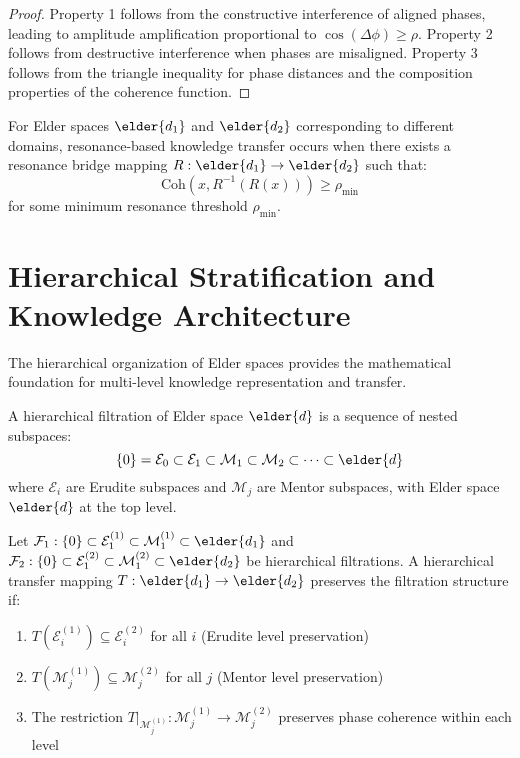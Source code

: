 \begin{proof}
Property 1 follows from the constructive interference of aligned phases, leading to amplitude amplification proportional to $\cos(\Delta\phi) \geq \rho$. Property 2 follows from destructive interference when phases are misaligned. Property 3 follows from the triangle inequality for phase distances and the composition properties of the coherence function.
\end{proof}

\begin{corollary}
For Elder spaces $\elder{d_1}$ and $\elder{d_2}$ corresponding to different domains, resonance-based knowledge transfer occurs when there exists a resonance bridge mapping $R: \elder{d_1} \rightarrow \elder{d_2}$ such that:
\begin{equation}
\text{Coh}(x, R^{-1}(R(x))) \geq \rho_{\text{min}}
\end{equation}
for some minimum resonance threshold $\rho_{\text{min}}$.
\end{corollary}

\section{Hierarchical Stratification and Knowledge Architecture}

The hierarchical organization of Elder spaces provides the mathematical foundation for multi-level knowledge representation and transfer.

\begin{definition}
A hierarchical filtration of Elder space $\elder{d}$ is a sequence of nested subspaces:
\begin{equation}
\{0\} = \mathcal{E}_0 \subset \mathcal{E}_1 \subset \mathcal{M}_1 \subset \mathcal{M}_2 \subset \cdots \subset \elder{d}
\end{equation}
where $\mathcal{E}_i$ are Erudite subspaces and $\mathcal{M}_j$ are Mentor subspaces, with Elder space $\elder{d}$ at the top level.
\end{definition}

\begin{theorem}
Let $\mathcal{F}_1: \{0\} \subset \mathcal{E}_1^{(1)} \subset \mathcal{M}_1^{(1)} \subset \elder{d_1}$ and $\mathcal{F}_2: \{0\} \subset \mathcal{E}_1^{(2)} \subset \mathcal{M}_1^{(2)} \subset \elder{d_2}$ be hierarchical filtrations. A hierarchical transfer mapping $T: \elder{d_1} \rightarrow \elder{d_2}$ preserves the filtration structure if:
\begin{enumerate}
    \item $T(\mathcal{E}_i^{(1)}) \subseteq \mathcal{E}_i^{(2)}$ for all $i$ (Erudite level preservation)
    \item $T(\mathcal{M}_j^{(1)}) \subseteq \mathcal{M}_j^{(2)}$ for all $j$ (Mentor level preservation)
    \item The restriction $T|_{\mathcal{M}_j^{(1)}}: \mathcal{M}_j^{(1)} \rightarrow \mathcal{M}_j^{(2)}$ preserves phase coherence within each level
\end{enumerate}
\end{theorem}


